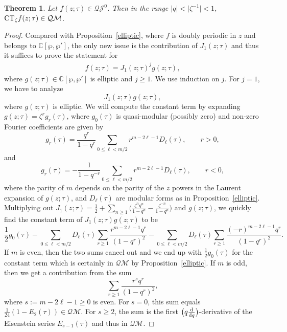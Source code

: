 \documentclass[pdftex]{sigma}
\numberwithin{equation}{section}
\newtheorem{Theorem}{Theorem}[section]
\theoremstyle{definition}
\begin{document}
\begin{Theorem} \label{quasi} Let $f(z;\tau) \in \mathcal{QJ}^0$. Then in the range $|q|<\bigl|\zeta^{-1}\bigr|<1$, ${\rm CT}_\zeta f(z;\tau) \in \mathcal{QM}$.
\end{Theorem}
\begin{proof}
Compared with Proposition~\ref{elliptic}, where $f$ is doubly periodic in $z$ and belongs to $\mathbb{C}[\wp,\wp']$, the only new issue is the contribution of $J_1(z;\tau)$ and thus it suffices to prove the statement for
\begin{align*}
f(z;\tau)=J_1(z;\tau)^j g(z;\tau),
\end{align*}
where $g(z;\tau) \in \mathbb{C}[\wp,\wp']$ is elliptic and $j \geq 1$.
We use induction on $j$. For $j=1$, we have to
analyze
\[
J_1(z;\tau) g(z;\tau),
\]
where $g(z;\tau)$ is elliptic. We will compute the constant term by expanding $g(z;\tau)=\zeta^r g_r(\tau)$, where $g_0(\tau)$ is quasi-modular (possibly zero) and
non-zero Fourier coefficients are given by~\cite{BFM}
\[
g_r(\tau)=\frac{q^{r}}{1-q^r} \sum_{0 \leq \ell < m/2} r^{m-2\ell-1} D_{\ell}(\tau), \qquad r>0,
\]
and
\[
g_r(\tau)=-\frac{1}{1-q^{-r}} \sum_{0 \leq \ell < m/2} r^{m-2\ell-1} D_{\ell}(\tau), \qquad r<0,
\]
where the parity of $m$ depends on the parity of the $z$ powers in the Laurent expansion of $g(z;\tau)$, and $D_{\ell}(\tau)$ are modular forms as in Proposition~\ref{elliptic}.
Multiplying out $J_1(z;\tau)=\frac12+\sum_{n \geq 1} \bigl(\frac{\zeta^n q^n}{1-q^n}-\frac{\zeta^{-n}}{1-q^n} \bigr)$ and $g(z;\tau)$, we quickly find the constant term of $J_1(z;\tau) g(z;\tau)$ to be
\[
\frac{1}{2}g_0(\tau)- \sum_{0 \leq \ell < m/2} D_\ell(\tau) \sum_{r \geq 1} \frac{ r^{m-2\ell-1} q^r}{(1-q^r)^2} - \sum_{0 \leq \ell < m/2} D_\ell(\tau) \sum_{r \geq 1} \frac{ (-r)^{m-2\ell-1} q^r}{(1-q^r)^2}.
\]
If $m$ is even, then the two sums cancel out and we end up with $\frac12 g_0(\tau)$ for the constant term which is certainly in $\mathcal{QM}$ by Proposition~\ref{elliptic}. If $m$ is odd, then we get a contribution from the sum
\[
\sum_{r \geq 1} \frac{ r^{s} q^r}{(1-q^r)^2},
\]
where $s:=m- 2\ell -1 \geq 0$ is even. For $s=0$, this sum equals $\frac{1}{24}(1-E_2(\tau)) \in \mathcal{QM}$. For $s \geq 2$, the sum is the first $\bigl(q \frac{{\rm d}}{{\rm d}q}\bigr)$-derivative of
the Eisenstein series $E_{s-1}(\tau)$ and thus in $\mathcal{QM}$.


\end{proof}
\end{document}

